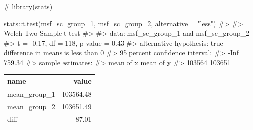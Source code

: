 \documentclass[
  12pt,
  a4paper,
  oneside]{tesesusp}
\newenvironment{Shaded}{\begin{snugshade}}{\end{snugshade}}
\newcommand{\AttributeTok}[1]{\textcolor[rgb]{0.40,0.45,0.13}{#1}}
\newcommand{\CommentTok}[1]{\textcolor[rgb]{0.37,0.37,0.37}{#1}}
\newcommand{\FunctionTok}[1]{\textcolor[rgb]{0.28,0.35,0.67}{#1}}
\newcommand{\NormalTok}[1]{\textcolor[rgb]{0.00,0.23,0.31}{#1}}
\newcommand{\SpecialCharTok}[1]{\textcolor[rgb]{0.37,0.37,0.37}{#1}}
\newcommand{\StringTok}[1]{\textcolor[rgb]{0.13,0.47,0.30}{#1}}
\begin{document}
\begin{Shaded}
\begin{Highlighting}[numbers=left,,]
\CommentTok{\# library(stats)}

\NormalTok{stats}\SpecialCharTok{::}\FunctionTok{t.test}\NormalTok{(msf\_sc\_group\_1, msf\_sc\_group\_2, }\AttributeTok{alternative =} \StringTok{"less"}\NormalTok{)}
\CommentTok{\#\textgreater{} }
\CommentTok{\#\textgreater{}  Welch Two Sample t{-}test}
\CommentTok{\#\textgreater{} }
\CommentTok{\#\textgreater{} data:  msf\_sc\_group\_1 and msf\_sc\_group\_2}
\CommentTok{\#\textgreater{} t = {-}0.17, df = 118, p{-}value = 0.43}
\CommentTok{\#\textgreater{} alternative hypothesis: true difference in means is less than 0}
\CommentTok{\#\textgreater{} 95 percent confidence interval:}
\CommentTok{\#\textgreater{}    {-}Inf 759.34}
\CommentTok{\#\textgreater{} sample estimates:}
\CommentTok{\#\textgreater{} mean of x mean of y }
\CommentTok{\#\textgreater{}    103564    103651}
\end{Highlighting}
\end{Shaded}

\begin{Shaded}
\end{Shaded}

\begin{table}
\centering
\begin{tabular}{l|r}
\hline
name & value\\
\hline
mean\_group\_1 & 103564.48\\
\hline
mean\_group\_2 & 103651.49\\
\hline
diff & 87.01\\
\hline
\end{tabular}
\end{table}
\end{document}

